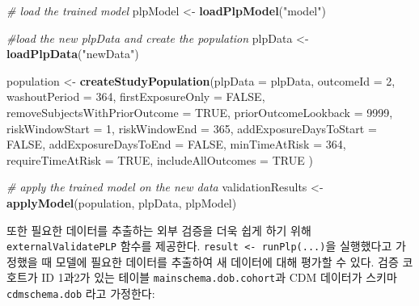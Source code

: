 \documentclass[10.5pt]{book}
\newenvironment{Shaded}{\begin{snugshade}}{\end{snugshade}}
\newcommand{\KeywordTok}[1]{\textcolor[rgb]{0.13,0.29,0.53}{\textbf{#1}}}
\newcommand{\DataTypeTok}[1]{\textcolor[rgb]{0.13,0.29,0.53}{#1}}
\newcommand{\DecValTok}[1]{\textcolor[rgb]{0.00,0.00,0.81}{#1}}
\newcommand{\StringTok}[1]{\textcolor[rgb]{0.31,0.60,0.02}{#1}}
\newcommand{\CommentTok}[1]{\textcolor[rgb]{0.56,0.35,0.01}{\textit{#1}}}
\newcommand{\OtherTok}[1]{\textcolor[rgb]{0.56,0.35,0.01}{#1}}
\newcommand{\NormalTok}[1]{#1}
\theoremstyle{definition}
\theoremstyle{definition}
\theoremstyle{definition}
\theoremstyle{remark}
\begin{document}
\begin{Shaded}
\begin{Highlighting}[]
\CommentTok{# load the trained model}
\NormalTok{plpModel <-}\StringTok{ }\KeywordTok{loadPlpModel}\NormalTok{(}\StringTok{"model"}\NormalTok{)}

\CommentTok{#load the new plpData and create the population}
\NormalTok{plpData <-}\StringTok{ }\KeywordTok{loadPlpData}\NormalTok{(}\StringTok{"newData"}\NormalTok{)}

\NormalTok{population <-}\StringTok{ }\KeywordTok{createStudyPopulation}\NormalTok{(}\DataTypeTok{plpData =}\NormalTok{ plpData,}
                                    \DataTypeTok{outcomeId =} \DecValTok{2}\NormalTok{,}
                                    \DataTypeTok{washoutPeriod =} \DecValTok{364}\NormalTok{,}
                                    \DataTypeTok{firstExposureOnly =} \OtherTok{FALSE}\NormalTok{,}
                                    \DataTypeTok{removeSubjectsWithPriorOutcome =} \OtherTok{TRUE}\NormalTok{,}
                                    \DataTypeTok{priorOutcomeLookback =} \DecValTok{9999}\NormalTok{,}
                                    \DataTypeTok{riskWindowStart =} \DecValTok{1}\NormalTok{,}
                                    \DataTypeTok{riskWindowEnd =} \DecValTok{365}\NormalTok{,}
                                    \DataTypeTok{addExposureDaysToStart =} \OtherTok{FALSE}\NormalTok{,}
                                    \DataTypeTok{addExposureDaysToEnd =} \OtherTok{FALSE}\NormalTok{,}
                                    \DataTypeTok{minTimeAtRisk =} \DecValTok{364}\NormalTok{,}
                                    \DataTypeTok{requireTimeAtRisk =} \OtherTok{TRUE}\NormalTok{,}
                                    \DataTypeTok{includeAllOutcomes =} \OtherTok{TRUE}
\NormalTok{)}

\CommentTok{# apply the trained model on the new data}
\NormalTok{validationResults <-}\StringTok{ }\KeywordTok{applyModel}\NormalTok{(population, plpData, plpModel)}
\end{Highlighting}
\end{Shaded}

또한 필요한 데이터를 추출하는 외부 검증을 더욱 쉽게 하기 위해
\texttt{externalValidatePLP} 함수를 제공한다.
\texttt{result\ \textless{}-\ runPlp(...)}을 실행했다고 가정했을 때
모델에 필요한 데이터를 추출하여 새 데이터에 대해 평가할 수 있다. 검증
코호트가 ID 1과2가 있는 테이블 \texttt{mainschema.dob.cohort}과 CDM
데이터가 스키마 \texttt{cdmschema.dob} 라고 가정한다:
\end{document}
